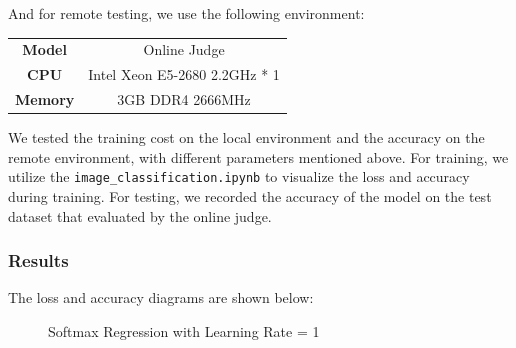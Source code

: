 \documentclass{article}
\begin{document}
And for remote testing, we use the following environment:

\begin{table}[!htbp]
    \begin{center}
    \begin{tabular}[c]{cc}
        \textbf{Model} & Online Judge \\
        \textbf{CPU} & Intel Xeon E5-2680 2.2GHz * 1 \\
        \textbf{Memory} & 3GB DDR4 2666MHz
    \end{tabular}
    \end{center}
\end{table}

We tested the training cost on the local environment and the accuracy on the remote environment, with different parameters mentioned above. For training, we utilize the \texttt{image\_classification.ipynb} to visualize the loss and accuracy during training. For testing, we recorded the accuracy of the model on the test dataset that evaluated by the online judge.

\subsubsection{Results}

The loss and accuracy diagrams are shown below:

\begin{figure}[htbp]
  \centering
  \caption{Softmax Regression with Learning Rate = 1}
\end{figure}
\end{document}
